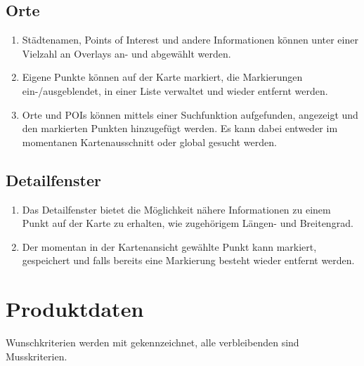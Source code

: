\documentclass[10pt]{scrreprt}
\begin{document}
\section{Orte}
\begin{enumerate}[leftmargin=2cm,resume]
\item Städtenamen, Points of Interest und andere Informationen können unter einer Vielzahl an Overlays an- und abgewählt werden.
\item \W Eigene Punkte können auf der Karte markiert, die Markierungen ein-/ausgeblendet, in einer Liste verwaltet und wieder entfernt werden.
\item \W Orte und POIs können mittels einer Suchfunktion aufgefunden, angezeigt und den markierten Punkten hinzugefügt werden. Es kann dabei entweder im momentanen Kartenausschnitt oder global gesucht werden.
\end{enumerate}

\section{Detailfenster}
\begin{enumerate}[leftmargin=2cm,resume]
\item Das Detailfenster bietet die Möglichkeit nähere Informationen zu einem Punkt auf der Karte zu erhalten, wie zugehörigem Längen- und Breitengrad.
\item Der momentan in der Kartenansicht gewählte Punkt kann markiert,  gespeichert und falls bereits eine Markierung besteht wieder entfernt werden.
\end{enumerate}



\chapter{Produktdaten}

\renewcommand{\labelenumi}{\textbf{/D\numprint{\theenumi}0/}}
Wunschkriterien werden mit \W  gekennzeichnet, alle verbleibenden sind Musskriterien.\\

\vspace{5mm}
\end{document}
